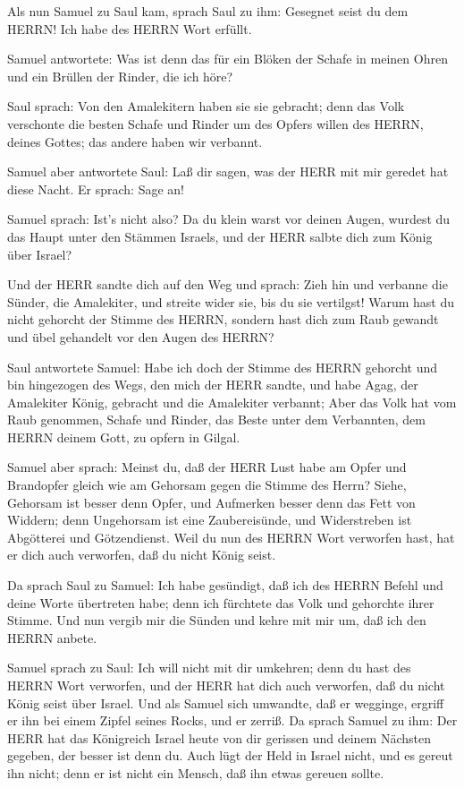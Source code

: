  Als nun Samuel zu Saul kam, sprach Saul zu ihm: Gesegnet
seist du dem HERRN! Ich habe des HERRN Wort erfüllt.

 Samuel antwortete: Was ist denn das für ein Blöken der
Schafe in meinen Ohren und ein Brüllen der Rinder, die ich höre?

 Saul sprach: Von den Amalekitern haben sie sie gebracht;
denn das Volk verschonte die besten Schafe und Rinder um des Opfers
willen des HERRN, deines Gottes; das andere haben wir verbannt.

 Samuel aber antwortete Saul: Laß dir sagen, was der HERR
mit mir geredet hat diese Nacht. Er sprach: Sage an!

 Samuel sprach: Ist's nicht also? Da du klein warst vor
deinen Augen, wurdest du das Haupt unter den Stämmen Israels, und der
HERR salbte dich zum König über Israel?

 Und der HERR sandte dich auf den Weg und sprach: Zieh hin
und verbanne die Sünder, die Amalekiter, und streite wider sie, bis du
sie vertilgst!  Warum hast du nicht gehorcht der Stimme des
HERRN, sondern hast dich zum Raub gewandt und übel gehandelt vor den
Augen des HERRN?

 Saul antwortete Samuel: Habe ich doch der Stimme des HERRN
gehorcht und bin hingezogen des Wegs, den mich der HERR sandte, und habe
Agag, der Amalekiter König, gebracht und die Amalekiter verbannt;
 Aber das Volk hat vom Raub genommen, Schafe und Rinder,
das Beste unter dem Verbannten, dem HERRN deinem Gott, zu opfern in
Gilgal.

 Samuel aber sprach: Meinst du, daß der HERR Lust habe am
Opfer und Brandopfer gleich wie am Gehorsam gegen die Stimme des Herrn?
Siehe, Gehorsam ist besser denn Opfer, und Aufmerken besser denn das
Fett von Widdern;  denn Ungehorsam ist eine Zaubereisünde,
und Widerstreben ist Abgötterei und Götzendienst. Weil du nun des HERRN
Wort verworfen hast, hat er dich auch verworfen, daß du nicht König
seist.

 Da sprach Saul zu Samuel: Ich habe gesündigt, daß ich des
HERRN Befehl und deine Worte übertreten habe; denn ich fürchtete das
Volk und gehorchte ihrer Stimme.  Und nun vergib mir die
Sünden und kehre mit mir um, daß ich den HERRN anbete.

 Samuel sprach zu Saul: Ich will nicht mit dir umkehren;
denn du hast des HERRN Wort verworfen, und der HERR hat dich auch
verworfen, daß du nicht König seist über Israel.  Und als
Samuel sich umwandte, daß er wegginge, ergriff er ihn bei einem Zipfel
seines Rocks, und er zerriß.  Da sprach Samuel zu ihm: Der
HERR hat das Königreich Israel heute von dir gerissen und deinem
Nächsten gegeben, der besser ist denn du.  Auch lügt der
Held in Israel nicht, und es gereut ihn nicht; denn er ist nicht ein
Mensch, daß ihn etwas gereuen sollte.

